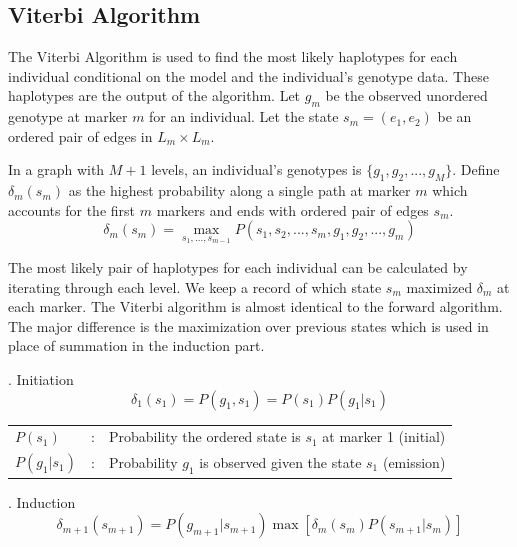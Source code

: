 \documentclass[a4paper,11pt,twoside,abstraction,titlepage]{article}
\begin{document}
\newpage
\subsection{Viterbi Algorithm}

The Viterbi Algorithm is used to find the most likely haplotypes for each individual conditional on the model and the individual's genotype data.  These haplotypes are the output of the algorithm.  Let $g_m$ be the observed unordered genotype at marker $m$ for an individual.  Let the state $s_m = (e_1, e_2)$ be an ordered pair of edges in $L_m \times L_m$.

In a graph with $M+1$ levels, an individual's genotypes is $\{g_1, g_2, ... , g_M\}$.  Define $\delta_m(s_m)$ as the highest probability along a single path at marker $m$ which accounts for the first $m$ markers and ends with ordered pair of edges $s_m$.
\begin{equation*}
\delta_m(s_m) = \max_{s_1,...,s_{m-1}} P(s_1,s_2,...,s_m, g_1, g_2,..., g_m)
\end{equation*}

The most likely pair of haplotypes for each individual can be calculated by iterating through each level.  We keep a record of which state $s_m$ maximized $\delta_m$ at each marker.  The Viterbi algorithm is almost identical to the forward algorithm.  The major difference is the maximization over previous states which is used in place of summation in the induction part. \cite{rabiner}

\vspace{10pt}
. Initiation
\begin{equation*}
\delta_1(s_1) = P(g_1, s_1) = P(s_1) P(g_1|s_1)
\end{equation*}

\begin{framed}
\begin{tabular}{lll}
\hspace{-20pt} $P(s_1)$ & : & \hspace{-5pt}Probability the ordered state is $s_1$ at marker 1 (initial)\\
\hspace{-20pt} $P(g_1|s_1)$ & :& \hspace{-5pt}Probability $g_1$ is observed given the state $s_1$ (emission)
\end{tabular}
\end{framed}


\vspace{10pt}
. Induction
\begin{equation*}
\delta_{m+1}(s_{m+1}) = P(g_{m+1}|s_{m+1}) \max \left[ \delta_m(s_m) P(s_{m+1}|s_m) \right] 
\end{equation*}
\end{document}
